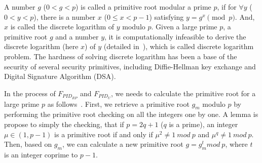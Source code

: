 A number $g$ ($0<g<p$) is called a primitive root modular a prime $p$, if for ${\forall}y$ ($0<y<p$), there is a  number $x$ ($0\le x <p-1$) satisfying $y=g^x \pmod p$.
And, $x$ is called the discrete logarithm of $y$ modulo $p$. Given a large prime $p$, a primitive root $g$ and a number $y$, it is computationally infeasible to derive the discrete logarithm (here $x$) of $y$ (detailed in~\cite{WXWM}), which is called discrete logarithm problem.
The hardness of solving discrete logarithm has been a base of the security of several security primitives, including Diffie-Hellman key exchange and Digital Signature Algorithm (DSA).

In the process of $F_{PID_{RP}}$ and $F_{PID_U}$, we needs to calculate the primitive root for a  large prime $p$ as follows~\cite{Shoup,Wang}.
First, we retrieve a primitive root $g_m$  modulo $p$ by performing the primitive root checking on all the integers one by one. 
 A lemma is propose to simply the checking, that if $p=2q+1$ ($q$ is a prime),  an integer $\mu \in (1, p-1)$ is a primitive root if and only if $\mu^2\neq 1 \ mod \ p$ and $\mu^q\neq 1 \ mod \ p$.
Then, based on $g_m$, we can calculate a new primitive root $g = g_{m}^{t} mod \ p$, where $t$ is an integer coprime to $p-1$.
 



